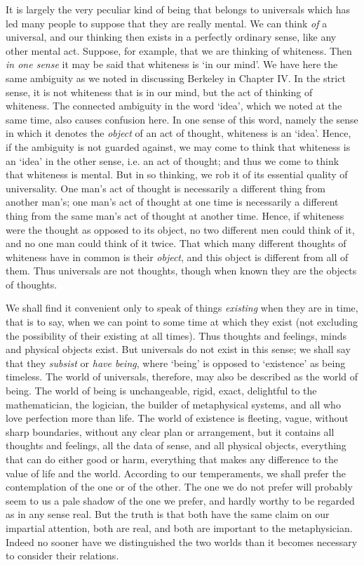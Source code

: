 \documentclass[oneside,letterpaper,12pt]{book}
\begin{document}
It is largely the very peculiar kind of being that belongs to universals
which has led many people to suppose that they are really mental. We can
think \emph{of} a universal, and our thinking then exists in a perfectly
ordinary sense, like any other mental act. Suppose, for example, that we
are thinking of whiteness. Then \emph{in one sense} it may be said that
whiteness is `in our mind'. We have here
the same ambiguity as we noted in discussing Berkeley in Chapter IV. In
the strict sense, it is not whiteness that is in our mind, but the act
of thinking of whiteness. The connected ambiguity in the word
`idea', which we noted at the same time,
also causes confusion here. In one sense of this word, namely the sense
in which it denotes the \emph{object} of an act of thought, whiteness is
an `idea'. Hence, if the ambiguity is not
guarded against, we may come to think that whiteness is an
`idea' in the other sense, i.e. an act
of thought; and thus we come to think that whiteness is mental. But in
so thinking, we rob it of its essential quality of universality. One
man's act of thought is necessarily a different thing
from another man's; one man's act of
thought at one time is necessarily a different thing from the same
man's act of thought at another time. Hence, if
whiteness were the thought as opposed to its object, no two different
men could think of it, and no one man could think of it twice. That
which many different thoughts of whiteness have in common is their
\emph{object}, and this object is different from all of them. Thus
universals are not thoughts, though when known they are the objects of
thoughts.

We shall find it convenient only to speak of things \emph{existing} when
they are in time, that is to say, when we can point to some time at
which they exist (not excluding the possibility of their existing at all
times). Thus thoughts and feelings, minds and physical objects exist.
\label{subsist} But universals do not exist in this sense; we shall say that they
\emph{subsist} or \emph{have being}, where
`being' is opposed to
`existence' as being timeless. The
world of universals, therefore, may also be described as the world of
being. The world of being is unchangeable, rigid, exact, delightful to
the mathematician, the logician, the builder of metaphysical systems,
and all who love perfection more than life. The world of existence is
fleeting, vague, without sharp boundaries, without any clear plan or
arrangement, but it contains all thoughts and feelings, all the data of
sense, and all physical objects, everything that can do either good or
harm, everything that makes any difference to the value of life and the
world. According to our temperaments, we shall prefer the contemplation
of the one or of the other. The one we do not prefer will probably seem
to us a pale shadow of the one we prefer, and hardly worthy to be
regarded as in any sense real. But the truth is that both have the same
claim on our impartial attention, both are real, and both are important
to the metaphysician. Indeed no sooner have we distinguished the two
worlds than it becomes necessary to consider their relations.
\end{document}
